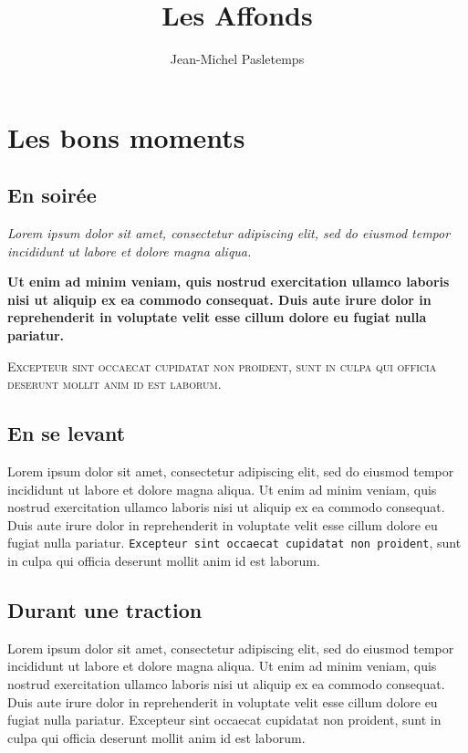 \documentclass[a4paper, 11pt]{article}
\title{Les Affonds}
\author{Jean-Michel Pasletemps}
\begin{document}
\tableofcontents
\maketitle

\section{Les bons moments}

\subsection{En soirée}

\textit{Lorem ipsum dolor sit amet, consectetur adipiscing elit, sed do eiusmod tempor incididunt ut labore et dolore magna aliqua.}

\begin{center}
\textbf{Ut enim ad minim veniam, quis nostrud exercitation ullamco laboris nisi ut aliquip ex ea commodo consequat. Duis aute irure dolor in reprehenderit in voluptate velit esse cillum dolore eu fugiat nulla pariatur.} 
\end{center}

\textsc{Excepteur sint occaecat cupidatat non proident, sunt in culpa qui officia deserunt mollit anim id est laborum.}

\subsection{En se levant}

{\tiny Lorem ipsum dolor} sit {\huge amet, consectetur adipiscing} elit, sed do eiusmod tempor incididunt ut labore et dolore magna aliqua. Ut {\small enim ad minim veniam}, {\large quis nostrud exercitation} ullamco laboris nisi ut aliquip ex ea commodo consequat. Duis aute irure dolor in reprehenderit \textsf{in voluptate velit esse} cillum dolore eu fugiat nulla pariatur. \texttt{Excepteur sint occaecat cupidatat non proident}, sunt in culpa qui officia deserunt mollit anim id est laborum.

\subsection{Durant une traction}

Lorem ipsum dolor sit amet, consectetur adipiscing elit, sed do eiusmod tempor incididunt ut labore et dolore magna aliqua. Ut enim ad minim veniam, quis nostrud exercitation ullamco laboris nisi ut aliquip ex ea commodo consequat. Duis aute irure dolor in reprehenderit in voluptate velit esse cillum dolore eu fugiat nulla pariatur. Excepteur sint occaecat cupidatat non proident, sunt in culpa qui officia deserunt mollit anim id est laborum.
\end{document}
